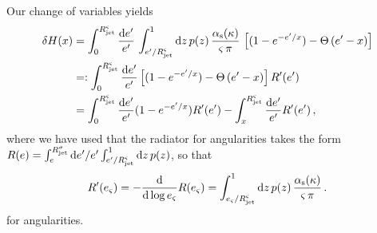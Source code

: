 \begin{enumerate}[label=\alph*)]
        Our change of variables yields
        \begin{align}
            \delta H(x)
            &=
            \int_0^{R_\text{jet}^\varsigma} \frac{\dd e'}{e'}
            \,
            \int_{e'/R_\text{jet}^\varsigma}^1 \dd z \, p(z)
            \,
            \frac{\alpha_{\mathrm{s}}(\kappa)}{\varsigma\,\pi}
            \,
            \left[
                (1 - e^{-e'/x})
                -
                \Theta\left(e' - x\right)
            \right]
            \\
            &=:
            \int_0^{R_\text{jet}^\varsigma} \frac{\dd e'}{e'}
            \left[
                (1 - e^{-e'/x})
                -
                \Theta\left(e' - x\right)
            \right]
            R'(e')
            \\
            &=
            \int_0^{R_\text{jet}^\varsigma}
            \frac{\dd e'}{e'}
            (1 - e^{-e'/x})
            R'(e')
            -
            \int_x^{R_\text{jet}^\varsigma}
            \frac{\dd e'}{e'}
            R'(e')
            \,,
        \end{align}
        where we have used that the radiator for angularities takes the form \(R(e) = \int_e^{R_\text{jet}^\sigma} \dd e' / e' \int_{e'/R_\text{jet}^\varsigma}^1 \dd z \, p(z)\), so that
        \begin{align}
            R'(e_\varsigma)
            =
            -\frac{\dd}{\dd\log e_\varsigma} R(e_\varsigma)
            =
            \int_{e_\varsigma/R_\text{jet}^\varsigma}^1 \dd z \, p(z)
            \,
            \frac{\alpha_{\mathrm{s}}(\kappa)}{\varsigma\,\pi}
            \,.
        \end{align}
        for angularities.


\end{enumerate}
